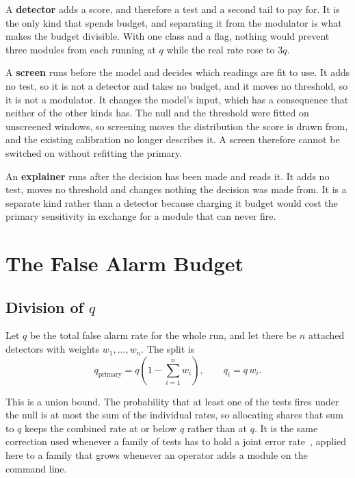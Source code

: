 \documentclass{article}
\begin{document}
A \textbf{detector} adds a score, and therefore a test and a second tail to pay
for. It is the only kind that spends budget, and separating it from the
modulator is what makes the budget divisible. With one class and a flag,
nothing would prevent three modules from each running at $q$ while the real
rate rose to $3q$.

A \textbf{screen} runs before the model and decides which readings are fit to
use. It adds no test, so it is not a detector and takes no budget, and it moves
no threshold, so it is not a modulator. It changes the model's input, which has
a consequence that neither of the other kinds has. The null and the threshold
were fitted on unscreened windows, so screening moves the distribution the
score is drawn from, and the existing calibration no longer describes it. A
screen therefore cannot be switched on without refitting the primary.

An \textbf{explainer} runs after the decision has been made and reads it. It
adds no test, moves no threshold and changes nothing the decision was made
from. It is a separate kind rather than a detector because charging it budget
would cost the primary sensitivity in exchange for a module that can never
fire.

\section{The False Alarm Budget}
\label{sec:budget}

\subsection{Division of $q$}

Let $q$ be the total false alarm rate for the whole run, and let there be $n$
attached detectors with weights $w_{1}, \dots, w_{n}$. The split is
\begin{equation}
  q_{\mathrm{primary}} = q \left( 1 - \sum_{i=1}^{n} w_{i} \right),
  \qquad
  q_{i} = q\, w_{i} .
\end{equation}

This is a union bound. The probability that at least one of the tests fires
under the null is at most the sum of the individual rates, so allocating shares
that sum to $q$ keeps the combined rate at or below $q$ rather than at $q$. It
is the same correction used whenever a family of tests has to hold a joint
error rate~\citep{dunn1961multiple}, applied here to a family that grows
whenever an operator adds a module on the command line.
\end{document}
